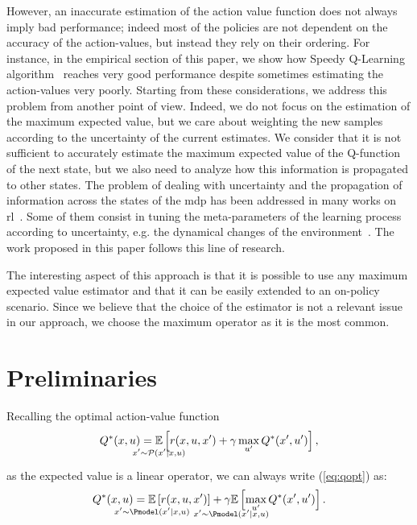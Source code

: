 However, an inaccurate estimation of the action value function does not always imply bad performance; indeed most of the policies are not dependent on the accuracy of the action-values, but instead they rely on their ordering. For instance, in the empirical section of this paper, we show how Speedy Q-Learning algorithm~\cite{NIPS2011_4251} reaches very good performance despite sometimes estimating the action-values very poorly. Starting from these considerations, we address this problem from another point of view. Indeed, we do not focus on the estimation of the maximum expected value, but we care about weighting the new samples according to the uncertainty of the current estimates. 
We consider that it is not sufficient to accurately estimate the maximum expected value of the Q-function of the next state, but we also need to analyze how this information is propagated to other states. The problem of dealing with uncertainty and the propagation of information across the states of the \gls{mdp} has been addressed in many works on \gls{rl}~\cite{mohagheghi2007proportional, Tewari2007}. Some of them consist in tuning the meta-parameters of the learning process according to uncertainty, e.g. the dynamical changes of the environment~\cite{schweighofer2003meta, Kobayashi2009, yoshida2013reinforcement}.
The work proposed in this paper follows this line of research.

The interesting aspect of this approach is that it is possible to use any maximum expected value estimator and that it can be easily extended to an on-policy scenario. Since we believe that the choice of the estimator is not a relevant issue in our approach, we choose the maximum operator as it is the most common.

\section{Preliminaries}
Recalling the optimal action-value function
\begin{align}
 Q^*(x,u)=\underset{\strut\mathclap{x'\sim \mathcal{P}(x'|x,u)}}{\mathbb{E}}\left[ r(x,u,x')+\gamma\max_{u'} Q^*(x',u')\right],
 \label{eq:qopt}
\end{align}
as the expected value is a linear operator, we can always write (\ref{eq:qopt}) as:
\begin{align}
 Q^*(x,u)=\underset{\strut\mathclap{x'\sim \Pmodel(x'|x,u)}}{\mathbb{E}}\left[ r(x,u,x')\right]+\underset{\strut\mathclap{x'\sim \Pmodel(x'|x,u)}}{\gamma\mathbb{E}}\left[ \max_{u'} Q^*(x',u')\right].
 \label{eq:qdec}
\end{align}

